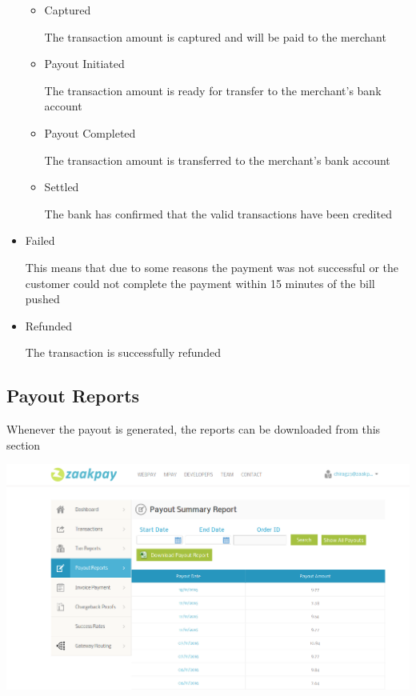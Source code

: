 \documentclass{article}
\begin{document}
\begin{itemize}
\begin{itemize}
\item Captured

The transaction amount is captured and will be paid to the merchant

\item Payout Initiated

The transaction amount is ready for transfer to the merchant's bank account
\item Payout Completed

The transaction amount is transferred to the merchant's bank account


\item Settled 

The bank has confirmed that the valid transactions have been credited 
\end{itemize}
\item Failed

This means that due to some reasons the payment was not successful or the customer could not complete the payment within 15 minutes of the bill pushed


\item Refunded

The transaction is successfully refunded

\newpage

\end{itemize}
\newpage
\subsection{Payout Reports}

Whenever the payout is generated, the reports can be downloaded from this section

\includegraphics[width=6.5 in,height=3.4 in]{payout_report.png}
\end{document}
